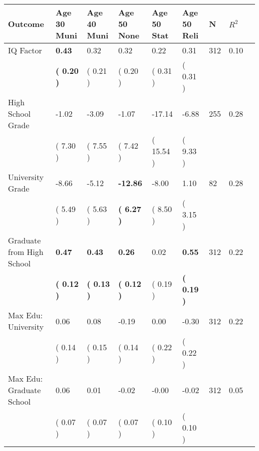 \begin{tabular}{L{6.2cm} C{1.8cm} C{1.8cm} C{1.8cm} C{1.8cm} C{1.8cm} C{1.8cm} C{0.3cm} C{0.3cm}}
\toprule
 \textbf{Outcome} & \textbf{Age 30 Muni} & \textbf{Age 40 Muni} & \textbf{Age 50 None} & \textbf{Age 50 Stat} & \textbf{Age 50 Reli} & \textbf{N} & \textbf{$ R^2$} \\
\midrule
IQ Factor & \textbf{     0.43} &      0.32 &      0.32 &      0.22 &      0.31  & 312 &       0.10 \\ 
 & \textbf{(     0.20 )} & (     0.21 ) & (     0.20 ) & (     0.31 ) & (     0.31 )  & \\
High School Grade &     -1.02 &     -3.09 &     -1.07 &    -17.14 &     -6.88  & 255 &       0.28 \\ 
 & (     7.30 ) & (     7.55 ) & (     7.42 ) & (    15.54 ) & (     9.33 )  & \\
University Grade &     -8.66 &     -5.12 & \textbf{   -12.86} &     -8.00 &      1.10  & 82 &       0.28 \\ 
 & (     5.49 ) & (     5.63 ) & \textbf{(     6.27 )} & (     8.50 ) & (     3.15 )  & \\
Graduate from High School & \textbf{     0.47} & \textbf{     0.43} & \textbf{     0.26} &      0.02 & \textbf{     0.55}  & 312 &       0.22 \\ 
 & \textbf{(     0.12 )} & \textbf{(     0.13 )} & \textbf{(     0.12 )} & (     0.19 ) & \textbf{(     0.19 )}  & \\
Max Edu: University &      0.06 &      0.08 &     -0.19 &      0.00 &     -0.30  & 312 &       0.22 \\ 
 & (     0.14 ) & (     0.15 ) & (     0.14 ) & (     0.22 ) & (     0.22 )  & \\
Max Edu: Graduate School &      0.06 &      0.01 &     -0.02 &     -0.00 &     -0.02  & 312 &       0.05 \\ 
 & (     0.07 ) & (     0.07 ) & (     0.07 ) & (     0.10 ) & (     0.10 )  & \\
\bottomrule
\end{tabular}
